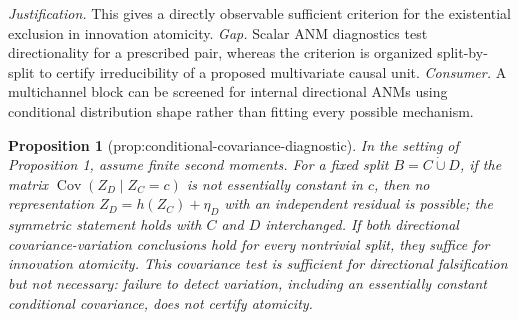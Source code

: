 \documentclass{article}
\newtheorem{proposition}{Proposition}
\begin{document}
\par\smallskip\noindent \textit{Justification.} This gives a directly observable sufficient criterion for the existential exclusion in innovation atomicity. \textit{Gap.} Scalar ANM diagnostics test directionality for a prescribed pair, whereas the criterion is organized split-by-split to certify irreducibility of a proposed multivariate causal unit. \textit{Consumer.} A multichannel block can be screened for internal directional ANMs using conditional distribution shape rather than fitting every possible mechanism.

\begin{proposition}[prop:conditional-covariance-diagnostic]\label{prop:conditional-covariance-diagnostic}
In the setting of Proposition 1, assume finite second moments. For a fixed split \(B=C\mathbin{\dot\cup}D\), if the matrix \(\operatorname{Cov}(Z_D\mid Z_C=c)\) is not essentially constant in \(c\), then no representation \(Z_D=h(Z_C)+\eta_D\) with an independent residual is possible; the symmetric statement holds with \(C\) and \(D\) interchanged. If both directional covariance-variation conclusions hold for every nontrivial split, they suffice for innovation atomicity. This covariance test is sufficient for directional falsification but not necessary: failure to detect variation, including an essentially constant conditional covariance, does not certify atomicity.
\end{proposition}
\end{document}

